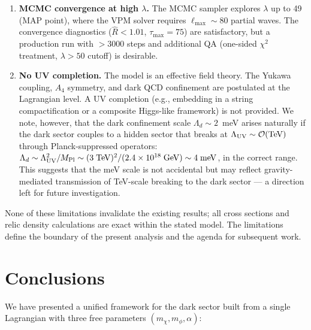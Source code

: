 \begin{enumerate}
\item \textbf{MCMC convergence at high $\lambda$.}
      The MCMC sampler explores $\lambda$ up to 49 (MAP point), where
      the VPM solver requires $\ell_{\max} \sim 80$ partial waves. The
      convergence diagnostics ($\hat{R} < 1.01$, $\tau_{\max} = 75$) are
      satisfactory, but a production run with $> 3000$ steps and additional
      QA (one-sided $\chi^2$ treatment, $\lambda > 50$ cutoff) is desirable.

\item \textbf{No UV completion.}
      The model is an effective field theory. The Yukawa coupling, $A_4$
      symmetry, and dark QCD confinement are postulated at the Lagrangian level.
      A UV completion (e.g., embedding in a string compactification or a
      composite Higgs-like framework) is not provided.
      We note, however, that the dark confinement scale
      $\Lambda_d \sim 2$~meV arises naturally if the dark sector
      couples to a hidden sector that breaks at
      $\Lambda_{\rm UV} \sim \mathcal{O}(\text{TeV})$ through
      Planck-suppressed operators:
      $\Lambda_d \sim \Lambda_{\rm UV}^2 / M_{\rm Pl} \sim
      (3\;\text{TeV})^2 / (2.4\times10^{18}\;\text{GeV})
      \sim 4\;\text{meV}$,
      in the correct range. This suggests that the meV scale
      is not accidental but may reflect gravity-mediated
      transmission of TeV-scale breaking to the dark sector ---
      a direction left for future investigation.
\end{enumerate}

None of these limitations invalidate the existing results; all cross sections
and relic density calculations are exact within the stated model. The
limitations define the boundary of the present analysis and the agenda for
subsequent work.


\section{Conclusions}
\label{disc:conclusions}

We have presented a unified framework for the dark sector built from a single
Lagrangian with three free parameters $(m_\chi, m_\phi, \alpha)$:


